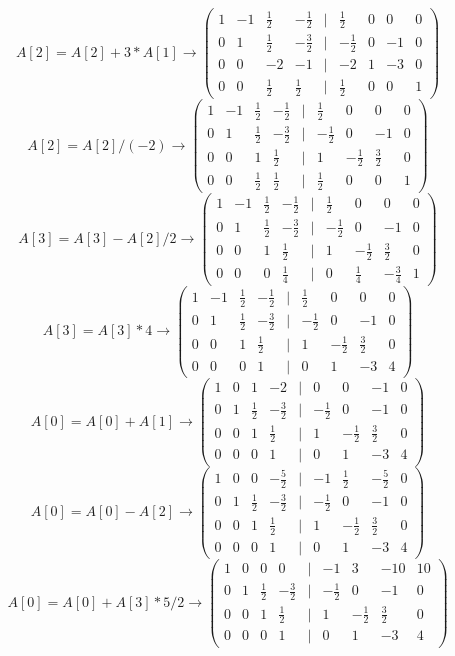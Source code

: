 \documentclass[a4paper]{article}
\newcommand{\mat}[1]{\begin{pmatrix} #1 \end{pmatrix}}
\begin{document}
\begin{enumerate}
    $$A[2] = A[2]+3*A[1] \to \mat{1 & -1 & \frac{1}{2} & -\frac{1}{2} & | & \frac{1}{2} & 0 & 0 & 0 \\ 0 & 1 & \frac{1}{2} & -\frac{3}{2} & | & -\frac{1}{2} & 0 & -1 & 0 \\ 0 & 0 & -2 & -1 & | & -2 & 1 & -3 & 0 \\ 0 & 0 & \frac{1}{2} & \frac{1}{2} & | & \frac{1}{2} & 0 & 0 & 1}$$
    $$A[2] = A[2]/(-2) \to \mat{1 & -1 & \frac{1}{2} & -\frac{1}{2} & | & \frac{1}{2} & 0 & 0 & 0 \\ 0 & 1 & \frac{1}{2} & -\frac{3}{2} & | & -\frac{1}{2} & 0 & -1 & 0 \\ 0 & 0 & 1 & \frac{1}{2} & | & 1 & -\frac{1}{2} & \frac{3}{2} & 0 \\ 0 & 0 & \frac{1}{2} & \frac{1}{2} & | & \frac{1}{2} & 0 & 0 & 1}$$
    $$A[3] = A[3]-A[2]/2 \to \mat{1 & -1 & \frac{1}{2} & -\frac{1}{2} & | & \frac{1}{2} & 0 & 0 & 0 \\ 0 & 1 & \frac{1}{2} & -\frac{3}{2} & | & -\frac{1}{2} & 0 & -1 & 0 \\ 0 & 0 & 1 & \frac{1}{2} & | & 1 & -\frac{1}{2} & \frac{3}{2} & 0 \\ 0 & 0 & 0 & \frac{1}{4} & | & 0 & \frac{1}{4} & -\frac{3}{4} & 1}$$
    $$A[3] = A[3]*4 \to \mat{1 & -1 & \frac{1}{2} & -\frac{1}{2} & | & \frac{1}{2} & 0 & 0 & 0 \\ 0 & 1 & \frac{1}{2} & -\frac{3}{2} & | & -\frac{1}{2} & 0 & -1 & 0 \\ 0 & 0 & 1 & \frac{1}{2} & | & 1 & -\frac{1}{2} & \frac{3}{2} & 0 \\ 0 & 0 & 0 & 1 & | & 0 & 1 & -3 & 4}$$
    $$A[0] = A[0]+A[1] \to \mat{1 & 0 & 1 & -2 & | & 0 & 0 & -1 & 0 \\ 0 & 1 & \frac{1}{2} & -\frac{3}{2} & | & -\frac{1}{2} & 0 & -1 & 0 \\ 0 & 0 & 1 & \frac{1}{2} & | & 1 & -\frac{1}{2} & \frac{3}{2} & 0 \\ 0 & 0 & 0 & 1 & | & 0 & 1 & -3 & 4}$$
    $$A[0] = A[0]-A[2] \to \mat{1 & 0 & 0 & -\frac{5}{2} & | & -1 & \frac{1}{2} & -\frac{5}{2} & 0 \\ 0 & 1 & \frac{1}{2} & -\frac{3}{2} & | & -\frac{1}{2} & 0 & -1 & 0 \\ 0 & 0 & 1 & \frac{1}{2} & | & 1 & -\frac{1}{2} & \frac{3}{2} & 0 \\ 0 & 0 & 0 & 1 & | & 0 & 1 & -3 & 4}$$
    $$A[0] = A[0]+A[3]*5/2 \to \mat{1 & 0 & 0 & 0 & | & -1 & 3 & -10 & 10 \\ 0 & 1 & \frac{1}{2} & -\frac{3}{2} & | & -\frac{1}{2} & 0 & -1 & 0 \\ 0 & 0 & 1 & \frac{1}{2} & | & 1 & -\frac{1}{2} & \frac{3}{2} & 0 \\ 0 & 0 & 0 & 1 & | & 0 & 1 & -3 & 4}$$

\end{enumerate}
\end{document}
